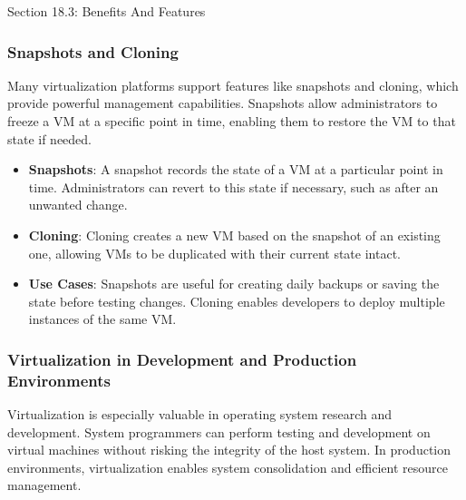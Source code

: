 \begin{notes}{Section 18.3: Benefits And Features}
\begin{highlight}
    \end{highlight}
    
    \subsubsection*{Snapshots and Cloning}
    
    Many virtualization platforms support features like snapshots and cloning, which provide powerful management capabilities. Snapshots allow administrators to freeze a VM at a specific point in time, 
    enabling them to restore the VM to that state if needed.
    
    \begin{highlight}
    
        \begin{itemize}
            \item \textbf{Snapshots}: A snapshot records the state of a VM at a particular point in time. Administrators can revert to this state if necessary, such as after an unwanted change.
            \item \textbf{Cloning}: Cloning creates a new VM based on the snapshot of an existing one, allowing VMs to be duplicated with their current state intact.
            \item \textbf{Use Cases}: Snapshots are useful for creating daily backups or saving the state before testing changes. Cloning enables developers to deploy multiple instances of the same VM.
        \end{itemize}
    
    \end{highlight}
    
    \subsubsection*{Virtualization in Development and Production Environments}
    
    Virtualization is especially valuable in operating system research and development. System programmers can perform testing and development on virtual machines without risking the integrity of the 
    host system. In production environments, virtualization enables system consolidation and efficient resource management.
    
    \begin{highlight}
    

\end{highlight}
\end{notes}
